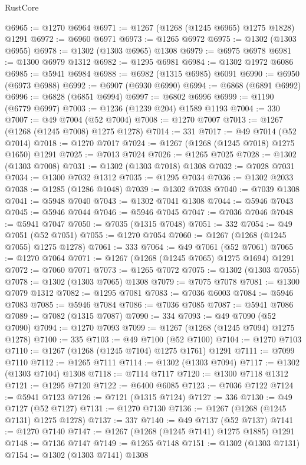 \begin{lexlean}{RustCore}
\begin{coremodule}
@6965 := @1270 @6964
@6971 := @1267 (@1268 (@1245 @6965) @1275 @1828) @1291
@6972 := @6960 @6971
@6973 := @1265 @6972
@6975 := @1302 (@1303 @6955)
@6978 := @1302 (@1303 @6965) @1308
@6979 := @6975 @6978
@6981 := @1300 @6979 @1312
@6982 := @1295 @6981
@6984 := @1302 @1972 @6086
@6985 := @5941 @6984
@6988 := @6982 (@1315 @6985) @6091
@6990 := @6950 (@6973 @6988)
@6992 := @6907 (@6930 @6990)
@6994 := @6868 (@6891 @6992)
@6996 := @6828 (@6851 @6994)
@6997 := @6802 @6996
@6999 := @1190 (@6779 @6997)
@7003 := @1236 (@1239 @204) @1589 @1193
@7004 := 330
@7007 := @49 @7004 (@52 @7004)
@7008 := @1270 @7007
@7013 := @1267 (@1268 (@1245 @7008) @1275 @1278)
@7014 := 331
@7017 := @49 @7014 (@52 @7014)
@7018 := @1270 @7017
@7024 := @1267 (@1268 (@1245 @7018) @1275 @1650) @1291
@7025 := @7013 @7024
@7026 := @1265 @7025
@7028 := @1302 (@1303 @7008)
@7031 := @1302 (@1303 @7018) @1308
@7032 := @7028 @7031
@7034 := @1300 @7032 @1312
@7035 := @1295 @7034
@7036 := @1302 @2033
@7038 := @1285 (@1286 @1048)
@7039 := @1302 @7038
@7040 := @7039 @1308
@7041 := @5948 @7040
@7043 := @1302 @7041 @1308
@7044 := @5946 @7043
@7045 := @5946 @7044
@7046 := @5946 @7045
@7047 := @7036 @7046
@7048 := @5941 @7047
@7050 := @7035 (@1315 @7048)
@7051 := 332
@7054 := @49 @7051 (@52 @7051)
@7055 := @1270 @7054
@7060 := @1267 (@1268 (@1245 @7055) @1275 @1278)
@7061 := 333
@7064 := @49 @7061 (@52 @7061)
@7065 := @1270 @7064
@7071 := @1267 (@1268 (@1245 @7065) @1275 @1694) @1291
@7072 := @7060 @7071
@7073 := @1265 @7072
@7075 := @1302 (@1303 @7055)
@7078 := @1302 (@1303 @7065) @1308
@7079 := @7075 @7078
@7081 := @1300 @7079 @1312
@7082 := @1295 @7081
@7083 := @7036 @6003
@7084 := @5946 @7083
@7085 := @5946 @7084
@7086 := @7036 @7085
@7087 := @5941 @7086
@7089 := @7082 (@1315 @7087)
@7090 := 334
@7093 := @49 @7090 (@52 @7090)
@7094 := @1270 @7093
@7099 := @1267 (@1268 (@1245 @7094) @1275 @1278)
@7100 := 335
@7103 := @49 @7100 (@52 @7100)
@7104 := @1270 @7103
@7110 := @1267 (@1268 (@1245 @7104) @1275 @1761) @1291
@7111 := @7099 @7110
@7112 := @1265 @7111
@7114 := @1302 (@1303 @7094)
@7117 := @1302 (@1303 @7104) @1308
@7118 := @7114 @7117
@7120 := @1300 @7118 @1312
@7121 := @1295 @7120
@7122 := @6400 @6085
@7123 := @7036 @7122
@7124 := @5941 @7123
@7126 := @7121 (@1315 @7124)
@7127 := 336
@7130 := @49 @7127 (@52 @7127)
@7131 := @1270 @7130
@7136 := @1267 (@1268 (@1245 @7131) @1275 @1278)
@7137 := 337
@7140 := @49 @7137 (@52 @7137)
@7141 := @1270 @7140
@7147 := @1267 (@1268 (@1245 @7141) @1275 @1885) @1291
@7148 := @7136 @7147
@7149 := @1265 @7148
@7151 := @1302 (@1303 @7131)
@7154 := @1302 (@1303 @7141) @1308

\end{coremodule}
\end{lexlean}
